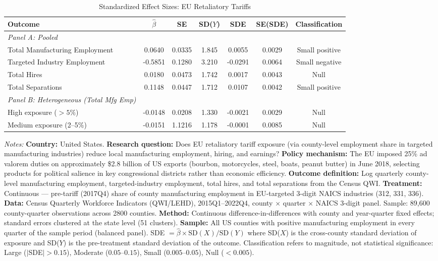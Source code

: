 \begin{table}[htbp]
\centering
\caption{Standardized Effect Sizes: EU Retaliatory Tariffs}
\label{tab:sde}
\begin{adjustbox}{max width=\textwidth}
\begin{tabular}{lcccccc}
\toprule
Outcome & $\hat{\beta}$ & SE & SD($Y$) & SDE & SE(SDE) & Classification \\
\midrule
\textit{Panel A: Pooled} & & & & & & \\
Total Manufacturing Employment & 0.0640 & 0.0335 & 1.845 & 0.0055 & 0.0029 & Small positive \\
Targeted Industry Employment & -0.5851 & 0.1280 & 3.210 & -0.0291 & 0.0064 & Small negative \\
Total Hires & 0.0180 & 0.0473 & 1.742 & 0.0017 & 0.0043 & Null \\
Total Separations & 0.1148 & 0.0447 & 1.712 & 0.0107 & 0.0042 & Small positive \\
\midrule
\textit{Panel B: Heterogeneous (Total Mfg Emp)} & & & & & & \\
\quad High exposure ($>5\%$) & -0.0148 & 0.0208 & 1.330 & -0.0021 & 0.0029 & Null \\
\quad Medium exposure (2--5\%) & -0.0151 & 1.1216 & 1.178 & -0.0001 & 0.0085 & Null \\
\bottomrule
\end{tabular}
\end{adjustbox}
\begin{tablenotes}[flushleft]
\small
\item \textit{Notes:} \textbf{Country:} United States. \textbf{Research question:} Does EU retaliatory tariff exposure (via county-level employment share in targeted manufacturing industries) reduce local manufacturing employment, hiring, and earnings? \textbf{Policy mechanism:} The EU imposed 25\% ad valorem duties on approximately \$2.8 billion of US exports (bourbon, motorcycles, steel, boats, peanut butter) in June 2018, selecting products for political salience in key congressional districts rather than economic efficiency. \textbf{Outcome definition:} Log quarterly county-level manufacturing employment, targeted-industry employment, total hires, and total separations from the Census QWI. \textbf{Treatment:} Continuous --- pre-tariff (2017Q4) share of county manufacturing employment in EU-targeted 3-digit NAICS industries (312, 331, 336). \textbf{Data:} Census Quarterly Workforce Indicators (QWI/LEHD), 2015Q1--2022Q4, county $\times$ quarter $\times$ NAICS 3-digit panel. Sample: 89,600 county-quarter observations across 2800 counties. \textbf{Method:} Continuous difference-in-differences with county and year-quarter fixed effects; standard errors clustered at the state level (51 clusters). \textbf{Sample:} All US counties with positive manufacturing employment in every quarter of the sample period (balanced panel). SDE $= \hat{\beta} \times \text{SD}(X) / \text{SD}(Y)$ where SD($X$) is the cross-county standard deviation of exposure and SD($Y$) is the pre-treatment standard deviation of the outcome. Classification refers to magnitude, not statistical significance: Large ($|$SDE$| > 0.15$), Moderate ($0.05$--$0.15$), Small ($0.005$--$0.05$), Null ($< 0.005$).
\end{tablenotes}
\end{table}
